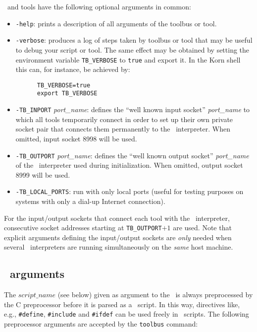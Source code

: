 \TB\ and tools have the following optional arguments in common:
\begin{itemize}

\item {\tt -help}: prints a description of all arguments of the toolbus or tool.

\item {\tt -verbose}: produces a log of steps taken by toolbus or tool
that may be useful to debug your script or tool. The same effect may be obtained
by setting the environment variable {\tt TB\_VERBOSE}
to {\tt true} and export it.
In the Korn shell this can, for instance, be achieved by:
\begin{verbatim}
      TB_VERBOSE=true
      export TB_VERBOSE
\end{verbatim}

\item {\tt -TB\_INPORT} {\em port\_name}: defines the ``well known input socket'' {\em port\_name}
to which all tools temporarily connect in order to set up their
own private socket pair that connects them permanently to the \TB\ interpreter.
When omitted, input socket 8998 will be used.
\item {\tt -TB\_OUTPORT} {\em port\_name}:  defines the ``well known output socket'' {\em port\_name}
of the \TB\ interpreter used during initialization.
When omitted, output socket 8999 will be used.
\item {\tt -TB\_LOCAL\_PORTS}: run with only local ports (useful for testing
purposes on systems with only a dial-up Internet connection).

\end{itemize}

For the input/output sockets that connect each tool with the \TB\ interpreter,
consecutive socket addresses starting at {\tt TB\_OUTPORT}$+1$ are used.
Note that explicit arguments defining the input/output sockets are {\em only}
needed when several \TB\ interpreters are running simultaneously on
the {\em same} host machine.

\subsection{\label{TB-args}\TB\ arguments}
The $script\_name$ (see below) given as argument to the \TB\ is always
preprocessed by the C preprocessor before it is parsed as a \T\ script.
In this way, directives like, e.g., {\tt \#define}, {\tt \#include} and
{\tt \#ifdef} can be used freely in \T\ scripts. The following
preprocessor arguments are accepted by the {\tt toolbus} command:

